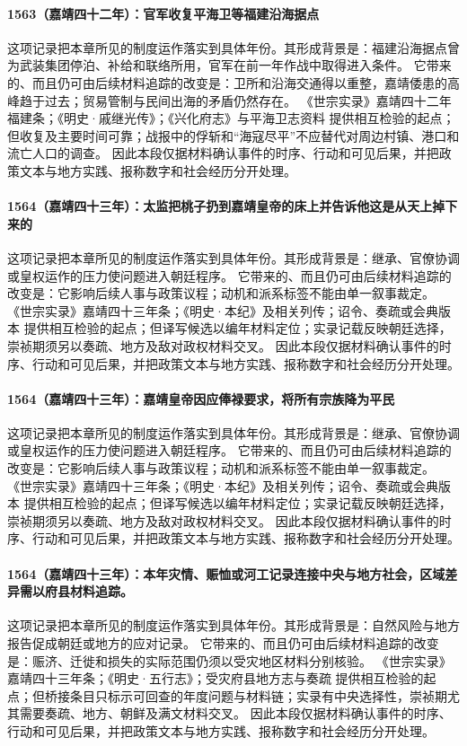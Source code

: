 \paragraph{1563（嘉靖四十二年）：官军收复平海卫等福建沿海据点} 这项记录把本章所见的制度运作落实到具体年份。其形成背景是：福建沿海据点曾为武装集团停泊、补给和联络所用，官军在前一年作战中取得进入条件。 它带来的、而且仍可由后续材料追踪的改变是：卫所和沿海交通得以重整，嘉靖倭患的高峰趋于过去；贸易管制与民间出海的矛盾仍然存在。 《世宗实录》嘉靖四十二年福建条；《明史·戚继光传》；《兴化府志》与平海卫志资料 提供相互检验的起点；但收复及主要时间可靠；战报中的俘斩和“海寇尽平”不应替代对周边村镇、港口和流亡人口的调查。 因此本段仅据材料确认事件的时序、行动和可见后果，并把政策文本与地方实践、报称数字和社会经历分开处理。

\paragraph{1564（嘉靖四十三年）：太监把桃子扔到嘉靖皇帝的床上并告诉他这是从天上掉下来的} 这项记录把本章所见的制度运作落实到具体年份。其形成背景是：继承、官僚协调或皇权运作的压力使问题进入朝廷程序。 它带来的、而且仍可由后续材料追踪的改变是：它影响后续人事与政策议程；动机和派系标签不能由单一叙事裁定。 《世宗实录》嘉靖四十三年条；《明史·本纪》及相关列传；诏令、奏疏或会典版本 提供相互检验的起点；但译写候选以编年材料定位；实录记载反映朝廷选择，崇祯期须另以奏疏、地方及敌对政权材料交叉。 因此本段仅据材料确认事件的时序、行动和可见后果，并把政策文本与地方实践、报称数字和社会经历分开处理。

\paragraph{1564（嘉靖四十三年）：嘉靖皇帝因应俸禄要求，将所有宗族降为平民} 这项记录把本章所见的制度运作落实到具体年份。其形成背景是：继承、官僚协调或皇权运作的压力使问题进入朝廷程序。 它带来的、而且仍可由后续材料追踪的改变是：它影响后续人事与政策议程；动机和派系标签不能由单一叙事裁定。 《世宗实录》嘉靖四十三年条；《明史·本纪》及相关列传；诏令、奏疏或会典版本 提供相互检验的起点；但译写候选以编年材料定位；实录记载反映朝廷选择，崇祯期须另以奏疏、地方及敌对政权材料交叉。 因此本段仅据材料确认事件的时序、行动和可见后果，并把政策文本与地方实践、报称数字和社会经历分开处理。

\paragraph{1564（嘉靖四十三年）：本年灾情、赈恤或河工记录连接中央与地方社会，区域差异需以府县材料追踪。} 这项记录把本章所见的制度运作落实到具体年份。其形成背景是：自然风险与地方报告促成朝廷或地方的应对记录。 它带来的、而且仍可由后续材料追踪的改变是：赈济、迁徙和损失的实际范围仍须以受灾地区材料分别核验。 《世宗实录》嘉靖四十三年条；《明史·五行志》；受灾府县地方志与奏疏 提供相互检验的起点；但桥接条目只标示可回查的年度问题与材料链；实录有中央选择性，崇祯期尤其需要奏疏、地方、朝鲜及满文材料交叉。 因此本段仅据材料确认事件的时序、行动和可见后果，并把政策文本与地方实践、报称数字和社会经历分开处理。

